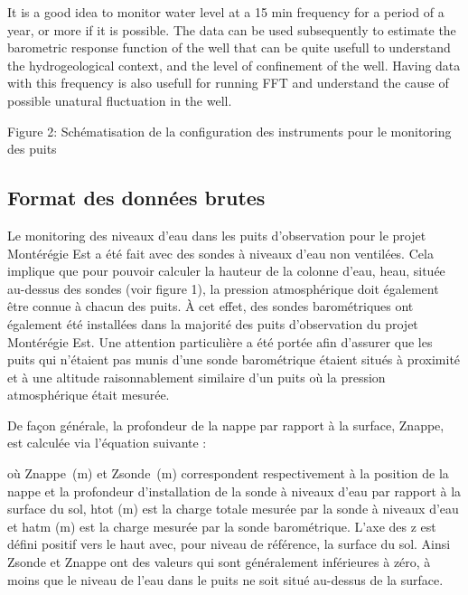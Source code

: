 \documentclass[12pt, letterpaper, fleqn]{report}
\begin{document}
It is a good idea to monitor water level at a 15 min frequency for a period of a year, or more if it is possible. The data can be used subsequently to estimate the barometric response function of the well that can be quite usefull to understand the hydrogeological context, and the level of confinement of the well. Having data with this frequency is also usefull for running FFT and understand the cause of possible unatural fluctuation in the well. 

Figure 2: Schématisation de la configuration des instruments pour le monitoring des puits

\subsection{Format des données brutes}

Le monitoring des niveaux d’eau dans les puits d’observation pour le projet Montérégie Est a été fait avec des sondes à niveaux d’eau non ventilées. Cela implique que pour pouvoir calculer la hauteur de la colonne d'eau, heau, située au-dessus des sondes (voir figure 1), la pression atmosphérique doit également être connue à chacun des puits. À cet effet, des sondes barométriques ont également été installées dans la majorité des puits d'observation du projet Montérégie Est. Une attention particulière a été portée afin d'assurer que les puits qui n'étaient pas munis d'une sonde barométrique étaient situés à proximité et à une altitude raisonnablement similaire d'un puits où la pression atmosphérique était mesurée.

De façon générale, la profondeur de la nappe par rapport à la surface, Znappe, est calculée via l'équation suivante : 

où Znappe (m) et Zsonde (m) correspondent respectivement à la position de la nappe et la profondeur d'installation de la sonde à niveaux d'eau par rapport à la surface du sol, htot (m) est la charge totale mesurée par la sonde à niveaux d'eau et hatm (m) est la charge mesurée par la sonde barométrique. L'axe des z est défini positif vers le haut avec, pour niveau de référence, la surface du sol. Ainsi Zsonde et Znappe ont des valeurs qui sont généralement inférieures à zéro, à moins que le niveau de l'eau dans le puits ne soit situé au-dessus de la surface.
\end{document}
